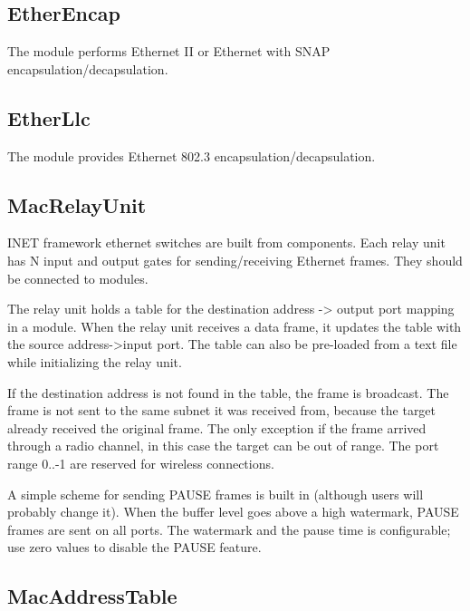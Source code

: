 \subsection{EtherEncap}
\label{sec:ethernet:etherencap}

The  module performs Ethernet II or Ethernet with SNAP
encapsulation/decapsulation.

\subsection{EtherLlc}
\label{sec:ethernet:etherllc}

The  module provides Ethernet 802.3
encapsulation/decapsulation.

\subsection{MacRelayUnit}
\label{sec:ethernet:macrelayunit}

INET framework ethernet switches are built from 
components. Each relay unit has N input and output gates for sending/receiving
Ethernet frames. They should be connected to  modules.

The relay unit holds a table for the destination address -> output port mapping
in a  module.  When the relay unit receives a data frame, it
updates the table with the source address->input port. The table can also be
pre-loaded from a text file while initializing the relay unit.

If the destination address is not found in the table, the frame is broadcast.
The frame is not sent to the same subnet it was received from, because the
target already received the original frame. The only exception if the frame
arrived through a radio channel, in this case the target can be out of range.
The port range 0..-1 are reserved for wireless connections.

A simple scheme for sending PAUSE frames is built in (although
users will probably change it). When the buffer level goes
above a high watermark, PAUSE frames are sent on all ports.
The watermark and the pause time is configurable; use zero
values to disable the PAUSE feature.

\subsection{MacAddressTable}
\label{sec:ethernet:macaddresstable}

